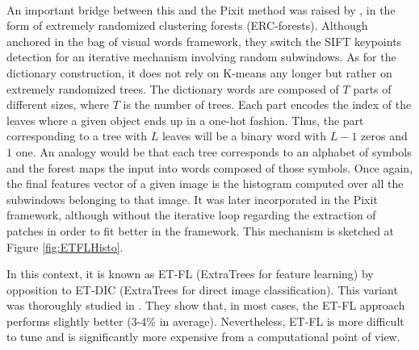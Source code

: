 \documentclass[a4paper]{report}
\begin{document}
\paragraph{}
An important bridge between this and the Pixit method was raised by \cite{ETFL}, in the form of extremely randomized clustering forests (ERC-forests). Although anchored in the bag of visual words framework, they switch the SIFT keypoints detection for an iterative mechanism involving random subwindows. As for the dictionary construction, it does not rely on K-means any longer but rather on extremely randomized trees. The dictionary words are composed of $T$ parts of different sizes, where $T$  is the number of trees. 
Each part encodes the index of the leaves where a given object ends up in a one-hot fashion. Thus, the part corresponding to a tree with $L$ leaves will be a binary word with $L-1$ zeros and $1$ one. An analogy would be that each tree corresponds to an alphabet of symbols and the forest maps the input into words composed of those symbols. Once again, the final features vector of a given image is the histogram computed over all the subwindows belonging to that image.
It was later incorporated in the Pixit framework, although without the iterative loop regarding the extraction of patches in order to fit better in the framework. This mechanism is sketched at Figure \ref{fig:ETFLHisto}. 
\par
In this context, it is known as ET-FL (ExtraTrees for feature learning) by opposition to ET-DIC (ExtraTrees for direct image classification). This variant was thoroughly studied in \cite{base}. They show that, in most cases, the ET-FL approach performs slightly better (3-4\% in average). Nevertheless, ET-FL is more difficult to tune and is significantly more expensive from a computational point of view.
\end{document}
